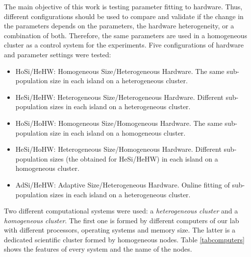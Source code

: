 \documentclass[final,1p,times]{elsarticle}
\begin{document}
The main objective of this work is testing parameter fitting to hardware. Thus, different configurations should be used to compare and validate if the change in the parameters depends on the parameters, the hardware heterogeneity, or a combination of both. Therefore, the same parameters are used in a homogeneous cluster as a control system for the experiments.
Five configurations of hardware and parameter settings were tested:


\begin{itemize}
\item HoSi/HeHW: Homogeneous Size/Heterogeneous Hardware. The same sub-population size in each island on a heterogeneous cluster.
\item HeSi/HeHW: Heterogeneous Size/Heterogeneous Hardware. Different sub-population sizes in each island on a heterogeneous cluster.
\item HoSi/HoHW: Homogeneous Size/Homogeneous Hardware. The same sub-population size in each island on a homogeneous cluster.
\item HeSi/HoHW: Heterogeneous Size/Homogeneous Hardware. Different sub-population sizes (the obtained for HeSi/HeHW) in each island on a homogeneous cluster.

\item AdSi/HeHW: Adaptive Size/Heterogeneous Hardware. Online fitting of sub-population sizes in each island on a heterogeneous cluster.
\end{itemize}

Two different computational systems were used: a {\em heterogeneous cluster} and a {\em homogeneous cluster}. The first one is formed by different computers of our lab with different processors, operating systems and memory size. The latter is a dedicated scientific cluster formed by homogeneous nodes. Table \ref{tabcomputers} shows the features of every system and the name of the nodes.
\end{document}
